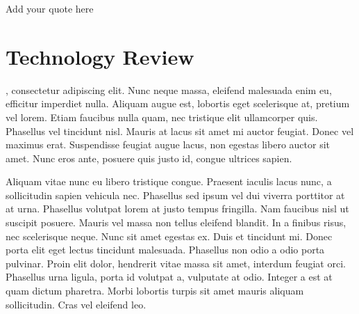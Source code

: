 \begin{savequote}[75mm]
Add your quote here
\end{savequote}

\chapter{Technology Review}
\label{technology}
, consectetur adipiscing elit. Nunc neque massa, eleifend malesuada enim eu, efficitur imperdiet nulla. Aliquam augue est, lobortis eget scelerisque at, pretium vel lorem. Etiam faucibus nulla quam, nec tristique elit ullamcorper quis. Phasellus vel tincidunt nisl. Mauris at lacus sit amet mi auctor feugiat. Donec vel maximus erat. Suspendisse feugiat augue lacus, non egestas libero auctor sit amet. Nunc eros ante, posuere quis justo id, congue ultrices sapien.

Aliquam vitae nunc eu libero tristique congue. Praesent iaculis lacus nunc, a sollicitudin sapien vehicula nec. Phasellus sed ipsum vel dui viverra porttitor at at urna. Phasellus volutpat lorem at justo tempus fringilla. Nam faucibus nisl ut suscipit posuere. Mauris vel massa non tellus eleifend blandit. In a finibus risus, nec scelerisque neque. Nunc sit amet egestas ex. Duis et tincidunt mi. Donec porta elit eget lectus tincidunt malesuada. Phasellus non odio a odio porta pulvinar. Proin elit dolor, hendrerit vitae massa sit amet, interdum feugiat orci. Phasellus urna ligula, porta id volutpat a, vulputate at odio. Integer a est at quam dictum pharetra. Morbi lobortis turpis sit amet mauris aliquam sollicitudin. Cras vel eleifend leo.

\clearpage




